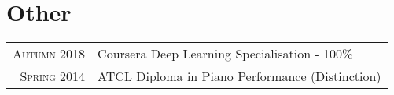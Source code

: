 \documentclass[a4paper,11pt]{article}
\begin{document}
\section{Other}
\begin{tabular}{rl}
  \textsc{Autumn} 2018 & Coursera Deep Learning Specialisation - 100\% \\
  \textsc{Spring} 2014 & \textsc{ATCL} Diploma in Piano Performance (Distinction) \\
\end{tabular}

\end{document}
